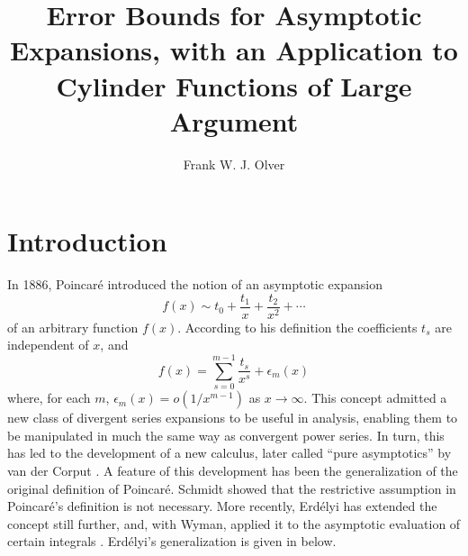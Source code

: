 \documentclass{article}
\begin{document}
{} {\usepackage{amsmath}}
{\usepackage{amssymb}} {\usepackage{amsthm}} {\usepackage{enumitem}}

{\title{Error Bounds for Asymptotic Expansions, with an Application to
Cylinder Functions of Large Argument}} {\author{Frank W. J. Olver}}

{\tableofcontents}

\section{Introduction}\label{sec:introduction}

In 1886, Poincar{\'e} {\cite{poincare1886}} introduced the notion of an
asymptotic expansion
\begin{equation}
  \label{eq:asymptotic_expansion} f (x) \sim t_0 + \frac{t_1}{x} +
  \frac{t_2}{x^2} + \cdots
\end{equation}
of an arbitrary function $f (x)$. According to his definition the coefficients
$t_s$ are independent of $x$, and
\begin{equation}
  \label{eq:remainder_definition} f (x) = \sum_{s = 0}^{m - 1} \frac{t_s}{x^s}
  + \epsilon_m (x)
\end{equation}
where, for each $m$, $\epsilon_m (x) = o (1 / x^{m - 1})$ as $x \to \infty$.
This concept admitted a new class of divergent series expansions to be useful
in analysis, enabling them to be manipulated in much the same way as
convergent power series. In turn, this has led to the development of a new
calculus, later called ``pure asymptotics'' by van der Corput
{\cite{van_der_corput}}. A feature of this development has been the
generalization of the original definition of Poincar{\'e}. Schmidt
{\cite{schmidt}} showed that the restrictive assumption in Poincar{\'e}'s
definition is not necessary. More recently, Erd{\'e}lyi {\cite{erdelyi}} has
extended the concept still further, and, with Wyman, applied it to the
asymptotic evaluation of certain integrals {\cite{erdelyi_wyman}}.
Erd{\'e}lyi's generalization is given in {\cite{erdelyi_generalization}}
below.
\end{document}
